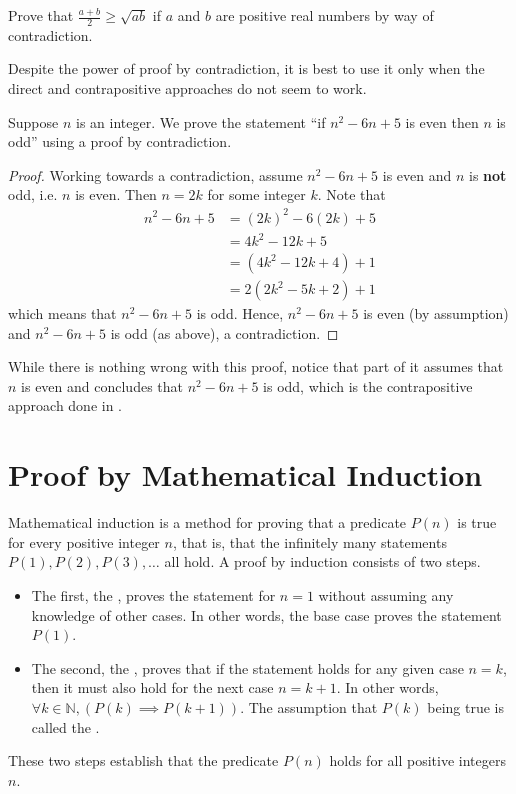 \begin{exercise}
    Prove that $\frac{a+b}{2} \geq \sqrt{ab}$ if $a$ and $b$ are positive real numbers by way of contradiction.
\end{exercise}

Despite the power of proof by contradiction, it is best to use it only when the direct and contrapositive approaches do not seem to work.
\begin{example}
    Suppose $n$ is an integer. We prove the statement ``if $n^2 - 6n + 5$ is even then $n$ is odd'' using a proof by contradiction.
    \begin{proof}
        Working towards a contradiction, assume $n^2 - 6n + 5$ is even and $n$ is \textbf{not} odd, i.e. $n$ is even. Then $n = 2k$ for some integer $k$. Note that
        \begin{align*}
            n^2 - 6n + 5 &= (2k)^2 - 6(2k) + 5\\
            &= 4k^2 - 12k + 5\\
            &= (4k^2 - 12k + 4) + 1\\
            &= 2(2k^2 - 5k + 2) + 1
        \end{align*}
        which means that $n^2 - 6n + 5$ is odd. Hence, $n^2 - 6n + 5$ is even (by assumption) and $n^2 - 6n + 5$ is odd (as above), a contradiction.
    \end{proof}
    While there is nothing wrong with this proof, notice that part of it assumes that $n$ is even and concludes that  $n^2 - 6n + 5$ is odd, which is the contrapositive approach done in .
\end{example}

\section{Proof by Mathematical Induction}
Mathematical induction is a method for proving that a predicate $P(n)$ is true for every positive integer $n$, that is, that the infinitely many statements $P(1), P(2), P(3), \dots$ all hold. A proof by induction consists of two steps.
\begin{itemize}
    \item The first, the , proves the statement for $n = 1$ without assuming any knowledge of other cases. In other words, the base case proves the statement $P(1)$.
    \item The second, the , proves that if the statement holds for any given case $n = k$, then it must also hold for the next case $n = k + 1$. In other words, $\forall k \in \mathbb{N}, (P(k) \implies P(k+1))$. The assumption that $P(k)$ being true is called the .
\end{itemize}
These two steps establish that the predicate $P(n)$ holds for all positive integers $n$.


